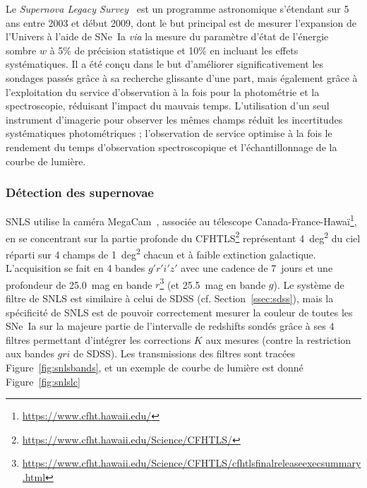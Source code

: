 \documentclass[../main/main.tex]{subfiles}
\begin{document}
Le \textit{Supernova Legacy Survey}~\citep[SNLS,][]{astier2006, sullivan2011}
est un programme astronomique s'étendant sur 5 ans entre 2003 et début 2009,
dont le but principal est de mesurer l'expansion de l'Univers à l'aide de SNe~Ia
\textit{via} la mesure du paramètre d'état de l'énergie sombre $w$ à 5\% de
précision statistique et 10\% en incluant les effets systématiques. Il a été
conçu dans le but d'améliorer significativement les sondages passés grâce à sa
recherche glissante d'une part, mais également grâce à l'exploitation du service
d'observation à la fois pour la photométrie et la spectroscopie, réduisant
l'impact du mauvais temps. L'utilisation d'un seul instrument d'imagerie pour
observer les mêmes champs réduit les incertitudes systématiques photométriques ;
l'observation de service optimise à la fois le rendement du temps d'observation
spectroscopique et l'échantillonnage de la courbe de lumière.

\subsubsection{Détection des supernovae}\label{sssec:snlsdetec}

SNLS utilise la caméra MegaCam~\citep{boulade2003}, associée au télescope
Canada-France-Hawaï\footnote{\href{https://www.cfht.hawaii.edu/}
{https://www.cfht.hawaii.edu/}}, en se concentrant sur la partie profonde du
CFHTLS\footnote{\href{https://www.cfht.hawaii.edu/Science/CFHTLS/}
{https://www.cfht.hawaii.edu/Science/CFHTLS/}} représentant \SI{4}{deg^2} du
ciel réparti sur 4 champs de \SI{1}{deg^2} chacun et à faible extinction
galactique. L'acquisition se fait en 4 bandes $g'r'i'z'$ avec une cadence de
\SI{7}{jours} et une profondeur de \SI{25.0}{mag} en bande
$r$\footnote{\href{https://www.cfht.hawaii.edu/Science/CFHTLS/cfhtlsfinalreleaseexecsummary.html}
{https://www.cfht.hawaii.edu/Science/CFHTLS/cfhtlsfinalreleaseexecsummary.html}}
(et \SI{25.5}{mag} en bande $g$). Le système de filtre de SNLS est similaire à
celui de SDSS (cf. Section~\ref{ssec:sdss}), mais la spécificité de SNLS est de
pouvoir correctement mesurer la couleur de toutes les SNe~Ia sur la majeure
partie de l'intervalle de redshifts sondés grâce à ses 4 filtres permettant
d'intégrer les corrections $K$ aux mesures (contre la restriction aux bandes
$gri$ de SDSS). Les transmissions des filtres sont tracées
Figure~\ref{fig:snlsbands}, et un exemple de courbe de lumière est donné
Figure~\ref{fig:snlslc}
\end{document}

